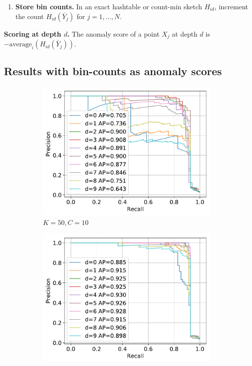 \documentclass[11pt,onecolumn]{article}
\begin{document}
\begin{enumerate}
	\item \textbf{Store bin counts.} In an exact hashtable or count-min sketch $H_{id}$, increment the count $H_{id}(\bar{Y}_j)$ for $j = 1, \dots, N$.
\end{enumerate}

\textbf{Scoring at depth $d$.} The anomaly score of a point $X_j$ at depth $d$ is $-\textrm{average}_i(H_{id}(\bar{Y}_j))$.

\pagebreak

\subsection{Results with bin-counts as anomaly scores}

\begin{figure}[h!]
    \centering
    \begin{subfigure}[t]{0.24\textwidth}
        \centering
        \includegraphics[width=\linewidth]{fig/chains_pr_k50c10d10.pdf}
        \caption{$K=50, C=10$}
    \end{subfigure}
    \hfill
    \begin{subfigure}[t]{0.24\textwidth}
        \centering
        \includegraphics[width=\linewidth]{fig/chains_pr_k50c50d10.pdf}

\end{subfigure}
\end{figure}
\end{document}
